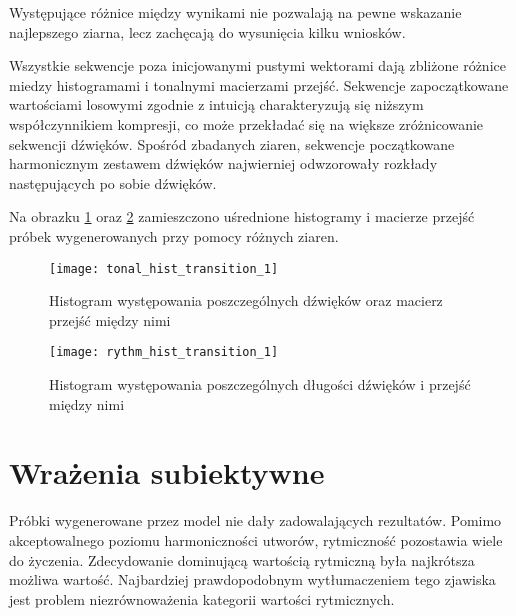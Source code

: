 {{        Występujące różnice między wynikami nie pozwalają na pewne wskazanie najlepszego ziarna, lecz 
        zachęcają do wysunięcia kilku wniosków.

        Wszystkie sekwencje poza inicjowanymi pustymi wektorami dają zbliżone różnice miedzy histogramami i 
        tonalnymi macierzami przejść. 
        Sekwencje zapoczątkowane wartościami losowymi zgodnie z intuicją charakteryzują się niższym współczynnikiem
        kompresji, co może przekładać się na większe zróżnicowanie sekwencji dźwięków.
        Spośród zbadanych ziaren, sekwencje początkowane harmonicznym zestawem dźwięków najwierniej
        odwzorowały rozkłady następujących po sobie dźwięków.
        
        Na obrazku \ref{tonal_hist_transition_1} oraz \ref{rythm_hist_transition_1} zamieszczono uśrednione 
        histogramy i macierze przejść próbek wygenerowanych przy pomocy różnych ziaren.

        \begin{figure}
            \centering
            \texttt{[image: tonal\_hist\_transition\_1]}
            \caption{Histogram występowania poszczególnych dźwięków oraz macierz przejść między nimi}
            \label{tonal_hist_transition_1}
        \end{figure}

        \begin{figure}
            \centering
            \texttt{[image: rythm\_hist\_transition\_1]}
            \caption{Histogram występowania poszczególnych długości dźwięków i przejść między nimi}
            \label{rythm_hist_transition_1}
        \end{figure}
    }

    \section{Wrażenia subiektywne}
    {
        Próbki wygenerowane przez model nie dały zadowalających rezultatów. Pomimo akceptowalnego poziomu 
        harmoniczności utworów, rytmiczność pozostawia wiele do życzenia. Zdecydowanie dominującą wartością 
        rytmiczną była najkrótsza możliwa wartość. Najbardziej prawdopodobnym wytłumaczeniem tego zjawiska jest 
        problem niezrównoważenia kategorii wartości rytmicznych. 

        \bigskip

}}
